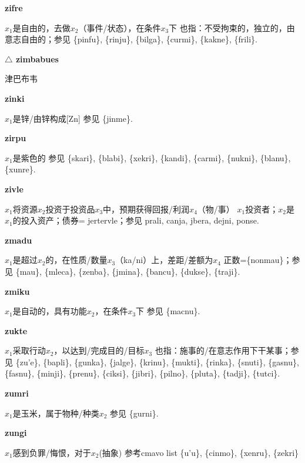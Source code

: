 \documentclass[notitlepage,twocolumn,a4paper,10pt]{book}
\begin{document}
{\sffamily\bfseries zifre}\enspace {\ttfamily\bfseries[zif     zi'e]}  $x_1$是自由的，去做$x_2$（事件\slash{}状态），在条件$x_3$下 \textemdash{} 也指：不受拘束的，独立的，由意志自由的；参见 \{pinfu\}, \{rinju\}, \{bilga\}, \{curmi\}, \{kakne\}, \{frili\}.

{\sffamily\bfseries $\triangle$ zimbabues} 津巴布韦

{\sffamily\bfseries zinki}\enspace {\ttfamily\bfseries[zin     zi'i]}  $x_1$是锌\slash{}由锌构成[Zn] \textemdash{} 参见 \{jinme\}.

{\sffamily\bfseries zirpu}\enspace {\ttfamily\bfseries[zir     zi'u]}  $x_1$是紫色的 \textemdash{} 参见 \{skari\}, \{blabi\}, \{xekri\}, \{kandi\}, \{carmi\}, \{nukni\}, \{blanu\}, \{xunre\}.

{\sffamily\bfseries zivle}  $x_1$将资源$x_2$投资于投资品$x_3$中，预期获得回报\slash{}利润$x_4$（物\slash{}事） \textemdash{} $x_1$投资者；$x_2$是$x_1$的投入资产；债券= {jertervle}；参见 {prali}, {canja}, {jbera}, {dejni}, {ponse}.

{\sffamily\bfseries zmadu}  $x_1$是超过$x_2$的，在性质\slash{}数量$x_3$（ka\slash{}ni）上，差距\slash{}差额为$x_4$ \textemdash{} 正数=\{nonmau\}；参见 \{mau\}, \{mleca\}, \{zenba\}, \{jmina\}, \{bancu\}, \{dukse\}, \{traji\}.

{\sffamily\bfseries zmiku}\enspace {\ttfamily\bfseries[    zmi]}  $x_1$是自动的，具有功能$x_2$，在条件$x_3$下 \textemdash{} 参见 \{macnu\}.

{\sffamily\bfseries zukte}\enspace {\ttfamily\bfseries[zuk     zu'e]}  $x_1$采取行动$x_2$，以达到\slash{}完成目的\slash{}目标$x_3$ \textemdash{} 也指：施事的\slash{}在意志作用下干某事；参见 \{zu'e\}, \{bapli\}, \{gunka\}, \{jalge\}, \{krinu\}, \{mukti\}, \{rinka\}, \{snuti\}, \{gasnu\}, \{fasnu\}, \{minji\}, \{prenu\}, \{ciksi\}, \{jibri\}, \{pilno\}, \{pluta\}, \{tadji\}, \{tutci\}.

{\sffamily\bfseries zumri}\enspace {\ttfamily\bfseries[    zmu]}  $x_1$是玉米，属于物种\slash{}种类$x_2$ \textemdash{} 参见 \{gurni\}.

{\sffamily\bfseries zungi}\enspace {\ttfamily\bfseries[zug]}  $x_1$感到负罪\slash{}悔恨，对于$x_2$(抽象) \textemdash{} 参考cmavo list \{u'u\}, \{cinmo\}, \{xenru\}, \{zekri\}
\end{document}
